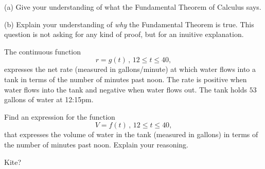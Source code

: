 \documentclass{ximera}
\begin{document}
\begin{question}  \label{Qdfdsftt5466544}
(a) Give your understanding of what the Fundamental Theorem of Calculus says.

(b) Explain your understanding of \emph{why} the Fundamental Theorem is true. This question is not asking for any kind of proof, but for an inuitive explanation.
\end{question}


\begin{question}  \label{Q45rfdg55}
The continuous function
\[
  r = g(t) \, ,  \, 12 \leq t \leq 40,
\]
expresses the net rate (measured in gallons/minute) at which water flows into a tank in terms of the number of minutes past noon. The rate is positive when water flows into the tank and negative when water flows out. The tank holds $53$ gallons of water at 12:15pm.

Find an expression for the function
\[
    V = f(t)\, ,  \, 12 \leq t \leq 40,
\]
that expresses the volume of water in the tank (measured in gallons) in terms of the number of minutes past noon. Explain your reasoning.

\end{question}

\begin{question}  \label{Q5434g54t5t}
Kite?

\end{question}
\end{document}

